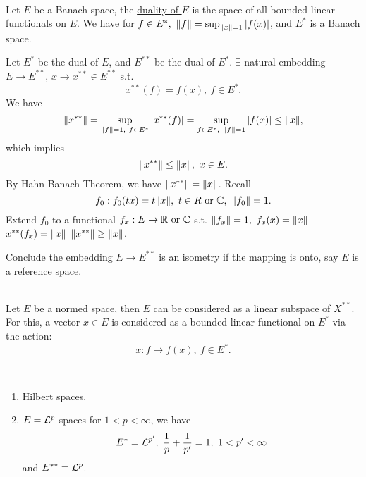 \begin{definition}\ \\
    Let $E$ be a Banach space, the \underline{duality of $E$} is the space of all bounded linear functionals on $E$. We have for $f \in E^*,\ \norm{f} = \sup_{\norm{x} = 1} \abs{f(x)}$, and $E^*$ is a Banach space.  
\end{definition}

\np Let $E^*$ be the dual of $E$, and $E^{**}$ be the dual of $E^*$. $\exists$ natural embedding $E \to E^{**}$, $x \to x^{**} \in E^{**}$ s.t.
\begin{equation*}
    x^{**}(f) = f(x),\ f \in E^*.
\end{equation*}
We have
\begin{equation*}
    \norm{x^{**}} = \sup_{\norm{f} = 1,\ f \in E^*} \abs{x^{**} (f)} = \sup_{f \in E^*,\ \norm{f} = 1} \abs{f(x)} \leq \norm{x},
\end{equation*}
which implies
\begin{equation*}
    \norm{x^{**}} \leq \norm{x},\ x \in E.
\end{equation*}
By Hahn-Banach Theorem, we have $\norm{x^{**}} = \norm{x}$. Recall 
\begin{equation*}
    f_0: f_0(tx) = t \norm{x},\ t \in R \text{ or } \mathbb{C},\ \norm{f_0} = 1.
\end{equation*}
Extend $f_0$ to a functional $f_x: E \to \mathbb{R} \text{ or } \mathbb{C}$ s.t. $\norm{f_x} = 1,\ f_x(x) = \norm{x}$ \imply $x^{**}(f_x) = \norm{x}$ \imply $\norm{x^{**}} \geq \norm{x}$.

\np Conclude the embedding $E \to E^{**}$ is an isometry if the mapping is onto, say $E$ is a reference space.

\begin{theorem}\ \\
Let $E$ be a normed space, then $E$ can be considered as a linear subspace of $X^{**}$. For this, a vector $x \in E$ is considered as a bounded linear functional on $E^*$ via the action:
\begin{equation*}
    x: f \to f(x),\ f \in E^*.
\end{equation*}
\end{theorem}


\begin{examples}\ 
\begin{enumerate}[label = (\alph*)]
    \item Hilbert spaces.
    \item $E = \mathcal{L}^p$ spaces for $1 < p < \infty$, we have
    \begin{equation*}
        E^* = \mathcal{L}^{p'},\ \frac{1}{p} + \frac{1}{p'} = 1,\ 1 < p' < \infty
    \end{equation*}
    and $E^{**} = \mathcal{L}^p$.
\end{enumerate}
\end{examples}


